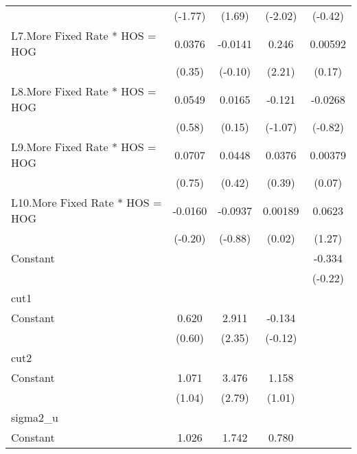 {\begin{tabular}{l*{4}{c}}
                &  (-1.77)         &   (1.69)         &  (-2.02)         &  (-0.42)         \\
[1em]
L7.More Fixed Rate * HOS = HOG&   0.0376         &  -0.0141         &    0.246\sym{*}  &  0.00592         \\
                &   (0.35)         &  (-0.10)         &   (2.21)         &   (0.17)         \\
[1em]
L8.More Fixed Rate * HOS = HOG&   0.0549         &   0.0165         &   -0.121         &  -0.0268         \\
                &   (0.58)         &   (0.15)         &  (-1.07)         &  (-0.82)         \\
[1em]
L9.More Fixed Rate * HOS = HOG&   0.0707         &   0.0448         &   0.0376         &  0.00379         \\
                &   (0.75)         &   (0.42)         &   (0.39)         &   (0.07)         \\
[1em]
L10.More Fixed Rate * HOS = HOG&  -0.0160         &  -0.0937         &  0.00189         &   0.0623         \\
                &  (-0.20)         &  (-0.88)         &   (0.02)         &   (1.27)         \\
[1em]
Constant        &                  &                  &                  &   -0.334         \\
                &                  &                  &                  &  (-0.22)         \\
\hline
cut1            &                  &                  &                  &                  \\
Constant        &    0.620         &    2.911\sym{*}  &   -0.134         &                  \\
                &   (0.60)         &   (2.35)         &  (-0.12)         &                  \\
\hline
cut2            &                  &                  &                  &                  \\
Constant        &    1.071         &    3.476\sym{**} &    1.158         &                  \\
                &   (1.04)         &   (2.79)         &   (1.01)         &                  \\
\hline
sigma2\_u        &                  &                  &                  &                  \\
Constant        &    1.026\sym{***}&    1.742\sym{***}&    0.780\sym{***}&                  \\

\end{tabular}}
